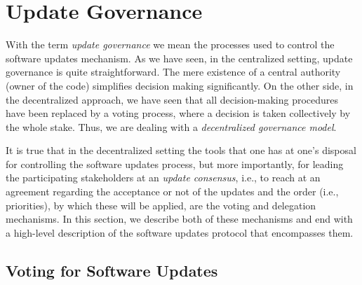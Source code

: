 \section{Update Governance}


With the term \emph{update governance} we mean the processes used to control the software updates mechanism. As we have seen, in the centralized setting, update governance is quite straightforward. The mere existence of a central authority (owner of the code) simplifies decision making significantly. On the other side, in the decentralized approach, we have seen that all decision-making procedures have been replaced by a voting process, where a decision is taken collectively by the whole stake. Thus, we are dealing with a \emph{decentralized governance model}.

It is true that in the decentralized setting the tools that one has at one's disposal for controlling the software updates process, but more importantly, for leading the participating stakeholders at an \emph{update consensus}, i.e., to reach at an agreement regarding the acceptance or not of the updates and the order (i.e., priorities), by which these will be applied,  are the voting and delegation mechanisms. In this section, we describe both of these mechanisms and end with a high-level description of the software updates protocol that encompasses them.

\subsection{Voting for Software Updates}



